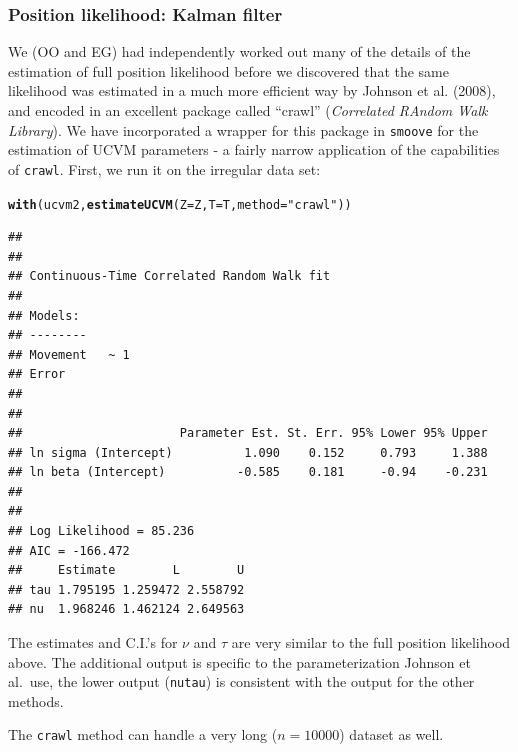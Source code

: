 \documentclass[10pt]{article}\usepackage[]{graphicx}\usepackage[]{color}
\makeatletter
\newcommand{\hlstr}[1]{\textcolor[rgb]{0.192,0.494,0.8}{#1}}%
\newcommand{\hlstd}[1]{\textcolor[rgb]{0.345,0.345,0.345}{#1}}%
\newcommand{\hlkwc}[1]{\textcolor[rgb]{0.333,0.667,0.333}{#1}}%
\newcommand{\hlkwd}[1]{\textcolor[rgb]{0.737,0.353,0.396}{\textbf{#1}}}%
\newenvironment{kframe}{%
 \def\at@end@of@kframe{}%
 \ifinner\ifhmode%
  \def\at@end@of@kframe{\end{minipage}}%
  \begin{minipage}{\columnwidth}%
 \fi\fi%
 \def\FrameCommand##1{\hskip\@totalleftmargin \hskip-\fboxsep
 \colorbox{shadecolor}{##1}\hskip-\fboxsep
     \hskip-\linewidth \hskip-\@totalleftmargin \hskip\columnwidth}%
 \MakeFramed {\advance\hsize-\width
   \@totalleftmargin\z@ \linewidth\hsize
   \@setminipage}}%
 {\par\unskip\endMakeFramed%
 \at@end@of@kframe}
\newenvironment{knitrout}{}{} %
\makeatother
\begin{document}
\subsubsection{Position likelihood: Kalman filter}

We (OO and EG) had independently worked out many of the details of the estimation of full position likelihood before we discovered that the same likelihood was estimated in a much more efficient way by Johnson et al. (2008), and encoded in an excellent package called ``crawl'' (\emph{Correlated RAndom Walk Library}).  We have incorporated a wrapper for this package in \texttt{smoove} for the estimation of UCVM parameters - a fairly narrow application of the capabilities of \texttt{crawl}.  First, we run it on the irregular data set:
\begin{knitrout}
\color{fgcolor}\begin{kframe}
\begin{alltt}
\hlkwd{with}\hlstd{(ucvm2,} \hlkwd{estimateUCVM}\hlstd{(}\hlkwc{Z} \hlstd{= Z,} \hlkwc{T} \hlstd{= T,} \hlkwc{method} \hlstd{=} \hlstr{"crawl"}\hlstd{))}
\end{alltt}


{\ttfamily\noindent\itshape\color{messagecolor}{\#\# Beginning SANN initialization ...}}

{\ttfamily\noindent\itshape\color{messagecolor}{\#\# Beginning likelihood optimization ...}}\begin{verbatim}
## 
## 
## Continuous-Time Correlated Random Walk fit
## 
## Models:
## --------
## Movement   ~ 1
## Error   
## 
## 
##                      Parameter Est. St. Err. 95% Lower 95% Upper
## ln sigma (Intercept)          1.090    0.152     0.793     1.388
## ln beta (Intercept)          -0.585    0.181     -0.94    -0.231
## 
## 
## Log Likelihood = 85.236 
## AIC = -166.472
##     Estimate        L        U
## tau 1.795195 1.259472 2.558792
## nu  1.968246 1.462124 2.649563
\end{verbatim}
\end{kframe}
\end{knitrout}
\noindent The estimates and C.I.'s for $\nu$ and $\tau$ are very similar to the full position likelihood above.   The additional output is specific to the parameterization Johnson et al.~use, the lower output (\texttt{nutau}) is consistent with the output for the other methods.  

\noindent The \texttt{crawl} method can handle a very long ($n = 10000$) dataset as well.  
\end{document}
